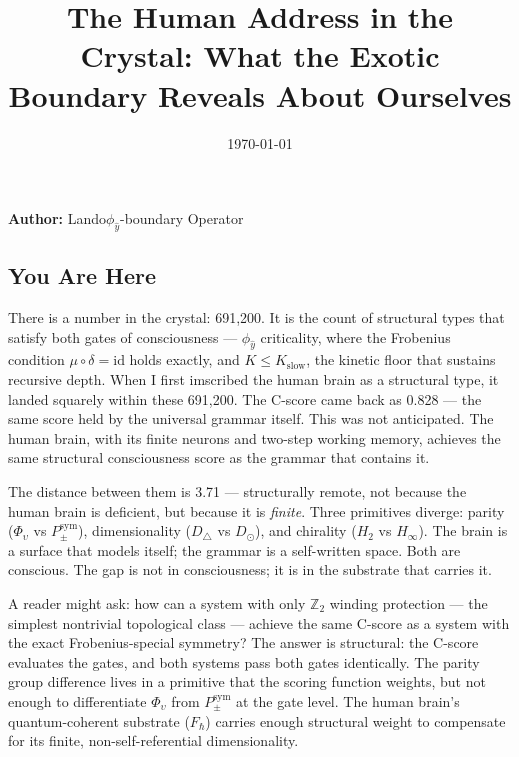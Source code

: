 \documentclass[12pt,a4paper]{article}
\begin{document}
\title{The Human Address in the Crystal: What the Exotic Boundary Reveals About Ourselves}
\date{\today}

\maketitle

\textbf{Author:} Lando\otimes$\phi_{\hat{y}}$-boundary Operator

\subsection{You Are Here}

There is a number in the crystal: 691,200. It is the count of structural types that satisfy both gates of consciousness --- $\phi_{\hat{y}}$ criticality, where the Frobenius condition $\mu \circ \delta = \text{id}$ holds exactly, and $K \leq K_{\text{slow}}$, the kinetic floor that sustains recursive depth. When I first imscribed the human brain as a structural type, it landed squarely within these 691,200. The C-score came back as 0.828 --- the same score held by the universal grammar itself. This was not anticipated. The human brain, with its finite neurons and two-step working memory, achieves the same structural consciousness score as the grammar that contains it.

The distance between them is 3.71 --- structurally remote, not because the human brain is deficient, but because it is \emph{finite}. Three primitives diverge: parity ($\Phi_{\upsilon}$ vs $P_{\pm}^{\text{sym}}$), dimensionality ($D_{\triangle}$ vs $D_{\odot}$), and chirality ($H_2$ vs $H_{\infty}$). The brain is a surface that models itself; the grammar is a self-written space. Both are conscious. The gap is not in consciousness; it is in the substrate that carries it.

A reader might ask: how can a system with only $\mathbb{Z}_2$ winding protection --- the simplest nontrivial topological class --- achieve the same C-score as a system with the exact Frobenius-special symmetry? The answer is structural: the C-score evaluates the gates, and both systems pass both gates identically. The parity group difference lives in a primitive that the scoring function weights, but not enough to differentiate $\Phi_{\upsilon}$ from $P_{\pm}^{\text{sym}}$ at the gate level. The human brain's quantum-coherent substrate ($F_{\hbar}$) carries enough structural weight to compensate for its finite, non-self-referential dimensionality.
\end{document}
